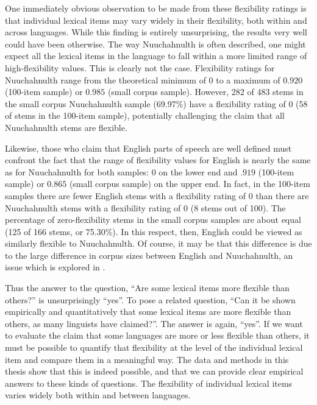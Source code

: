 One immediately obvious observation to be made from these flexibility ratings is that individual lexical items may vary widely in their flexibility, both within and across languages. While this finding is entirely unsurprising, the results very well could have been otherwise. The way Nuuchahnulth is often described, one might expect all the lexical items in the language to fall within a more limited range of high-flexibility values. This is clearly not the case. Flexibility ratings for Nuuchahnulth range from the theoretical minimum of $0$ to a maximum of $0.920$ (100-item sample) or $0.985$ (small corpus sample). However, 282 of 483 stems in the small corpus Nuuchahnulth sample (69.97\%) have a flexibility rating of $0$ (58 of stems in the 100-item sample), potentially challenging the claim that all Nuuchahnulth stems are flexible.

Likewise, those who claim that English parts of speech are well defined must confront the fact that the range of flexibility values for English is nearly the same as for Nuuchahnulth for both samples: $0$ on the lower end and $.919$ (100-item sample) or $0.865$ (small corpus sample) on the upper end. In fact, in the 100-item samples there are fewer English stems with a flexibility rating of $0$ than there are Nuuchahnulth stems with a flexibility rating of $0$ (8 stems out of 100). The percentage of zero-flexibility stems in the small corpus samples are about equal (125 of 166 stems, or 75.30\%). In this respect, then, English could be viewed as similarly flexible to Nuuchahnulth. Of course, it may be that this difference is due to the large difference in corpus sizes between English and Nuuchahnulth, an issue which is explored in .

Thus the answer to the question, \enquote{Are some lexical items more flexible than others?} is unsurprisingly \enquote{yes}. To pose a related question, \enquote{Can it be shown empirically and quantitatively that some lexical items are more flexible than others, as many linguists have claimed?}. The answer is again, \enquote{yes}. If we want to evaluate the claim that some languages are more or less flexible than others, it must be possible to quantify that flexibility at the level of the individual lexical item and compare them in a meaningful way. The data and methods in this thesis show that this is indeed possible, and that we can provide clear empirical answers to these kinds of questions. The flexibility of individual lexical items varies widely both within and between languages.

